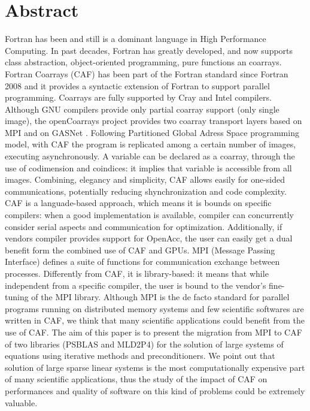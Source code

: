 \documentclass{IOS-Book-Article}
\begin{document}
\section{Abstract}
Fortran has been and still is a dominant language in High Performance Computing. In past decades, Fortran has greatly developed,  and now supports class abstraction, object-oriented programming, pure functions an coarrays. 
Fortran Coarrays (CAF) has been part of the Fortran standard since Fortran 2008 and it provides a syntactic extension of Fortran to support parallel programming.  
Coarrays are fully supported by Cray and Intel compilers. Although GNU compilers provide only partial coarray support  (only single image),  the openCoarrays project provides two coarray transport layers based on MPI and on GASNet \cite{r1}.
Following Partitioned Global Adress Space programming model, with CAF the program is replicated among a certain number of images, executing asynchronously. A variable can be declared as a coarray, through the use of codimension and coindices: it implies that variable is accessible from all images. Combining, elegancy and simplicity, CAF allows easily for one-sided communications, potentially reducing shynchronization and code complexity.
CAF is a languade-based approach, which means it is bounds on specific compilers: when a good implementation is available, compiler can concurrently consider serial aspects and communication for optimization. Additionally, if vendors compiler provides support for OpenAcc, the user can easily get a dual benefit form the combined use of CAF and GPUs.  
MPI (Message Passing Interface) defines a suite of functions for communication exchange between processes. Differently from CAF, it is library-based: it means that while independent from a specific compiler, the user is bound to the vendor's fine-tuning of the MPI library.
Although MPI is the de facto standard for parallel programs running on distributed memory systems and few scientific softwares are written in CAF, we think that many scientific applications could benefit from the use of CAF. 
The aim of this paper is to present the migration from MPI to CAF of two libraries (PSBLAS \cite{r2} and MLD2P4\cite{r3}) for the solution of large systems of equations using iterative methods and preconditioners. We point out that solution of large sparse linear systems is the most computationally expensive part of many scientific applications, thus the study of the impact of CAF on performances and quality of software on this kind of problems could be extremely valuable.  
\end{document}
